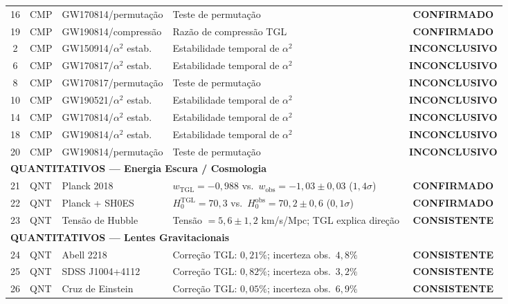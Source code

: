 \documentclass[12pt,a4paper,twoside]{article}
\newcommand{\alphaii}{\alpha^{2}}
\newcommand{\confirmed}{\textcolor{tglgreen}{\textbf{CONFIRMADO}}}
\newcommand{\consistent}{\textcolor{tglblue}{\textbf{CONSISTENTE}}}
\newcommand{\inconclusive}{\textcolor{tglgray}{\textbf{INCONCLUSIVO}}}
\begin{document}
\begin{small}
\begin{longtable}{clp{3.5cm}p{4.5cm}c}
16 & CMP & GW170814/permuta\c{c}\~ao & Teste de permuta\c{c}\~ao                     & \confirmed \\
19 & CMP & GW190814/compress\~ao  & Raz\~ao de compress\~ao TGL                      & \confirmed \\
2  & CMP & GW150914/$\alphaii$ estab. & Estabilidade temporal de $\alphaii$           & \inconclusive \\
6  & CMP & GW170817/$\alphaii$ estab. & Estabilidade temporal de $\alphaii$           & \inconclusive \\
8  & CMP & GW170817/permuta\c{c}\~ao & Teste de permuta\c{c}\~ao                     & \inconclusive \\
10 & CMP & GW190521/$\alphaii$ estab. & Estabilidade temporal de $\alphaii$           & \inconclusive \\
14 & CMP & GW170814/$\alphaii$ estab. & Estabilidade temporal de $\alphaii$           & \inconclusive \\
18 & CMP & GW190814/$\alphaii$ estab. & Estabilidade temporal de $\alphaii$           & \inconclusive \\
20 & CMP & GW190814/permuta\c{c}\~ao & Teste de permuta\c{c}\~ao                     & \inconclusive \\
%
\midrule
\multicolumn{5}{l}{\textbf{QUANTITATIVOS --- Energia Escura / Cosmologia}} \\
\midrule
21 & QNT & Planck 2018           & $w_{\text{TGL}} = -0{,}988$ vs.\ $w_{\text{obs}} = -1{,}03 \pm 0{,}03$ ($1{,}4\sigma$)  & \confirmed \\
22 & QNT & Planck + SH0ES        & $H_0^{\text{TGL}} = 70{,}3$ vs.\ $H_0^{\text{obs}} = 70{,}2 \pm 0{,}6$ ($0{,}1\sigma$) & \confirmed \\
23 & QNT & Tens\~ao de Hubble     & Tens\~ao $= 5{,}6 \pm 1{,}2$ km/s/Mpc; TGL explica dire\c{c}\~ao                        & \consistent \\
%
\midrule
\multicolumn{5}{l}{\textbf{QUANTITATIVOS --- Lentes Gravitacionais}} \\
\midrule
24 & QNT & Abell 2218            & Corre\c{c}\~ao TGL: $0{,}21\%$; incerteza obs.\ $4{,}8\%$  & \consistent \\
25 & QNT & SDSS J1004+4112       & Corre\c{c}\~ao TGL: $0{,}82\%$; incerteza obs.\ $3{,}2\%$  & \consistent \\
26 & QNT & Cruz de Einstein      & Corre\c{c}\~ao TGL: $0{,}05\%$; incerteza obs.\ $6{,}9\%$  & \consistent \\

\end{longtable}
\end{small}
\end{document}
